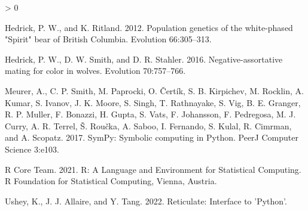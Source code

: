 \documentclass[
]{article}
\newlength{\cslhangindent}
\newenvironment{CSLReferences}[2] %
 {%
  \setlength{\parindent}{0pt}
  \ifodd #1 \everypar{\setlength{\hangindent}{\cslhangindent}}\ignorespaces\fi
  \ifnum #2 > 0
  \setlength{\parskip}{#2\baselineskip}
  \fi
 }%
 {}
\begin{document}
\hypertarget{refs}{}
\begin{CSLReferences}{1}{0}
\leavevmode\hypertarget{ref-hedrick_population_2012}{}%
Hedrick, P. W., and K. Ritland. 2012. Population genetics of the white-phased "{Spirit}" bear of {British} {Columbia}. Evolution 66:305--313.

\leavevmode\hypertarget{ref-hedrick_negative-assortative_2016}{}%
Hedrick, P. W., D. W. Smith, and D. R. Stahler. 2016. Negative-assortative mating for color in wolves. Evolution 70:757--766.

\leavevmode\hypertarget{ref-meurer_sympy:_2017}{}%
Meurer, A., C. P. Smith, M. Paprocki, O. Čertík, S. B. Kirpichev, M. Rocklin, A. Kumar, S. Ivanov, J. K. Moore, S. Singh, T. Rathnayake, S. Vig, B. E. Granger, R. P. Muller, F. Bonazzi, H. Gupta, S. Vats, F. Johansson, F. Pedregosa, M. J. Curry, A. R. Terrel, Š. Roučka, A. Saboo, I. Fernando, S. Kulal, R. Cimrman, and A. Scopatz. 2017. {SymPy}: Symbolic computing in {Python}. PeerJ Computer Science 3:e103.

\leavevmode\hypertarget{ref-r_core_team_r_2021}{}%
R Core Team. 2021. R: {A} {Language} and {Environment} for {Statistical} {Computing}. R Foundation for Statistical Computing, Vienna, Austria.

\leavevmode\hypertarget{ref-ushey_reticulate_2022}{}%
Ushey, K., J. J. Allaire, and Y. Tang. 2022. Reticulate: {Interface} to '{Python}'.

\end{CSLReferences}
\end{document}
